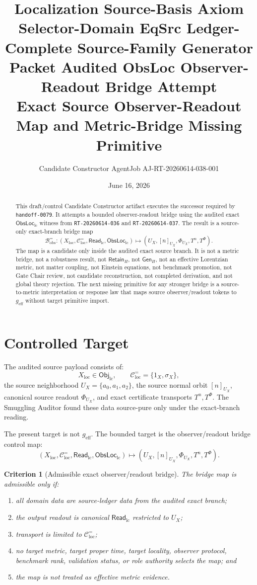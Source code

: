 \documentclass[11pt]{article}
\title{\textbf{Localization Source-Basis Axiom Selector-Domain EqSrc Ledger-Complete Source-Family Generator Packet Audited ObsLoc Observer-Readout Bridge Attempt}\\[0.35em]
\large Exact Source Observer-Readout Map and Metric-Bridge Missing Primitive}
\author{Candidate Constructor AgentJob AJ-RT-20260614-038-001}
\date{June 16, 2026}
\newcommand{\ObjLC}{\mathsf{Obj}_{\mathrm{lc}}}
\newcommand{\ReadLC}{\mathsf{Read}_{\mathrm{lc}}}
\newcommand{\ObsLocLC}{\mathsf{ObsLoc}_{\mathrm{lc}}}
\newcommand{\RetainH}{\mathsf{Retain}_{H}}
\newcommand{\GenH}{\mathsf{Gen}_{H}}
\newcommand{\geff}{g_{\mathrm{eff}}}
\newtheorem{criterion}{Criterion}
\begin{document}
\maketitle

\begin{abstract}
This draft/control Candidate Constructor artifact executes the
successor required by \texttt{handoff-0079}. It attempts a bounded
observer-readout bridge using the audited exact \(\ObsLocLC\) witness
from \texttt{RT-20260614-036} and \texttt{RT-20260614-037}. The
result is a source-only exact-branch bridge map
\[
    \mathcal{B}^{=}_{\mathrm{obs}}
    :
    (X_{\mathrm{loc}},\mathcal{C}^{=}_{\mathrm{loc}},\ReadLC,\ObsLocLC)
    \longmapsto
    (U_X,[n]_{U_X},\Phi_{U_X},T^n,T^\Phi).
\]
The map is a candidate only inside the audited exact source branch.
It is not a metric bridge, not a robustness result, not
\(\RetainH\), not \(\GenH\), not an effective Lorentzian metric, not
matter coupling, not Einstein equations, not benchmark promotion, not
Gate Chair review, not candidate reconstruction, not completed
derivation, and not global theory rejection. The next missing
primitive for any stronger bridge is a source-to-metric interpretation
or response law that maps source observer/readout tokens to
\(\geff\) without target primitive import.
\end{abstract}

\section{Controlled Target}

The audited source payload consists of:
\[
    X_{\mathrm{loc}}\in\ObjLC,\qquad
    \mathcal{C}^{=}_{\mathrm{loc}}=\{1_X,\sigma_X\},
\]
the source neighborhood \(U_X=\{a_0,a_1,a_2\}\), the source normal
orbit \([n]_{U_X}\), canonical source readout \(\Phi_{U_X}\), and exact
certificate transports \(T^n,T^\Phi\). The Smuggling Auditor found
these data source-pure only under the exact-branch reading.

The present target is not \(\geff\). The bounded target is the
observer/readout bridge control map:
\[
    (X_{\mathrm{loc}},\mathcal{C}^{=}_{\mathrm{loc}},\ReadLC,\ObsLocLC)
    \mapsto
    (U_X,[n]_{U_X},\Phi_{U_X},T^n,T^\Phi).
\]

\begin{criterion}[Admissible exact observer/readout bridge]
The bridge map is admissible only if:
\begin{enumerate}
    \item all domain data are source-ledger data from the audited
    exact branch;
    \item the output readout is canonical \(\ReadLC\) restricted to
    \(U_X\);
    \item transport is limited to
    \(\mathcal{C}^{=}_{\mathrm{loc}}\);
    \item no target metric, target proper time, target locality,
    observer protocol, benchmark rank, validation status, or role
    authority selects the map; and
    \item the map is not treated as effective metric evidence.
\end{enumerate}
\end{criterion}
\end{document}
